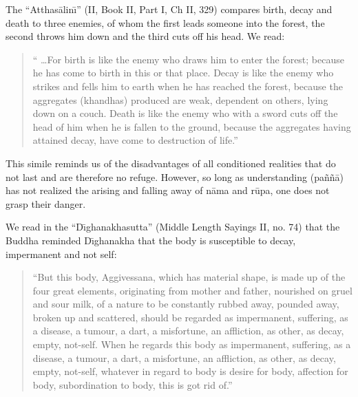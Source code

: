 \documentclass{book}
\begin{document}
The ``Atthas{\=a}lin\=\i'' (II, Book II, Part I, Ch II, 329) compares
birth, decay and death to three enemies, of whom the first leads
someone into the forest, the second throws him down and the third cuts
off his head. We read:




\begin{quote}\begin{flushleft}
`` \ldots For birth is like the enemy who draws him to enter the forest;
because he has come to birth in this or that place. Decay is like the
enemy who strikes and fells him to earth when he has reached the
forest, because the aggregates (khandhas) produced are weak, dependent
on others, lying down on a couch. Death is like the enemy who with a
sword cuts off the head of him when he is fallen to the ground, because
the aggregates having attained decay, have come to destruction of
life.''
\end{flushleft}\end{quote}




This simile reminds us of the disadvantages of all conditioned realities
that do not last and are therefore no refuge. However, so long as
understanding (pa\~n\~n{\=a}) has not realized the arising and falling
away of n{\=a}ma and r\=upa, one does not grasp their danger. 

We read in the ``D\=\i ghanakhasutta'' (Middle Length Sayings II, no. 74)
that the Buddha reminded D\=\i ghanakha that the body is susceptible to
decay, impermanent and not self:




\begin{quote}\begin{flushleft}
``But this body, Aggivessana, which has material shape, is made up of
the four great elements, originating from mother and father, nourished
on gruel and sour milk, of a nature to be constantly rubbed away,
pounded away, broken up and scattered, should be regarded as
impermanent, suffering, as a disease, a tumour, a dart, a misfortune,
an affliction, as other, as decay, empty, not-self. When he regards
this body as impermanent, suffering, as a disease, a tumour, a dart, a
misfortune, an affliction, as other, as decay, empty, not-self,
whatever in regard to body is desire for body, affection for body,
subordination to body, this is got rid of.''

\end{flushleft}\end{quote}
\end{document}
